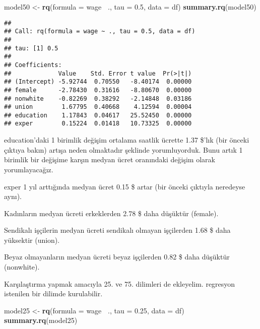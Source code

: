 \documentclass[
]{book}
\newenvironment{Shaded}{\begin{snugshade}}{\end{snugshade}}
\newcommand{\DataTypeTok}[1]{\textcolor[rgb]{0.13,0.29,0.53}{#1}}
\newcommand{\FloatTok}[1]{\textcolor[rgb]{0.00,0.00,0.81}{#1}}
\newcommand{\KeywordTok}[1]{\textcolor[rgb]{0.13,0.29,0.53}{\textbf{#1}}}
\newcommand{\NormalTok}[1]{#1}
\newcommand{\OperatorTok}[1]{\textcolor[rgb]{0.81,0.36,0.00}{\textbf{#1}}}
\newcommand{\StringTok}[1]{\textcolor[rgb]{0.31,0.60,0.02}{#1}}
\begin{document}
\begin{Shaded}
\begin{Highlighting}[]
\NormalTok{model50 <-}\StringTok{ }\KeywordTok{rq}\NormalTok{(}\DataTypeTok{formula =}\NormalTok{ wage }\OperatorTok{~}\NormalTok{., }\DataTypeTok{tau =} \FloatTok{0.5}\NormalTok{, }\DataTypeTok{data =}\NormalTok{ df)}
\KeywordTok{summary.rq}\NormalTok{(model50)}
\end{Highlighting}
\end{Shaded}

\begin{verbatim}
## 
## Call: rq(formula = wage ~ ., tau = 0.5, data = df)
## 
## tau: [1] 0.5
## 
## Coefficients:
##             Value    Std. Error t value  Pr(>|t|)
## (Intercept) -5.92744  0.70550   -8.40174  0.00000
## female      -2.78430  0.31616   -8.80670  0.00000
## nonwhite    -0.82269  0.38292   -2.14848  0.03186
## union        1.67795  0.40668    4.12594  0.00004
## education    1.17843  0.04617   25.52450  0.00000
## exper        0.15224  0.01418   10.73325  0.00000
\end{verbatim}

education'daki 1 birimlik değişim ortalama saatlik ücrette 1.37 \$'lık (bir önceki çıktıya bakın) artışa neden olmaktadır şeklinde yorumluyorduk. Bunu artık 1 birimlik bir değişime karşın medyan ücret oranındaki değişim olarak yorumlayacağız.

exper 1 yıl arttığında medyan ücret 0.15 \$ artar (bir önceki çıktıyla neredeyse aynı).

Kadınların medyan ücreti erkeklerden 2.78 \$ daha düşüktür (female).

Sendikalı işçilerin medyan ücreti sendikalı olmayan işçilerden 1.68 \$ daha yüksektir (union).

Beyaz olmayanların medyan ücreti beyaz işçilerden 0.82 \$ daha düşüktür (nonwhite).

Karşılaştırma yapmak amacıyla 25. ve 75. dilimleri de ekleyelim. regresyon istenilen bir dilimde kurulabilir.

\begin{Shaded}
\begin{Highlighting}[]
\NormalTok{model25 <-}\StringTok{ }\KeywordTok{rq}\NormalTok{(}\DataTypeTok{formula =}\NormalTok{ wage }\OperatorTok{~}\NormalTok{., }\DataTypeTok{tau =} \FloatTok{0.25}\NormalTok{, }\DataTypeTok{data =}\NormalTok{ df)}
\KeywordTok{summary.rq}\NormalTok{(model25)}
\end{Highlighting}
\end{Shaded}
\end{document}
